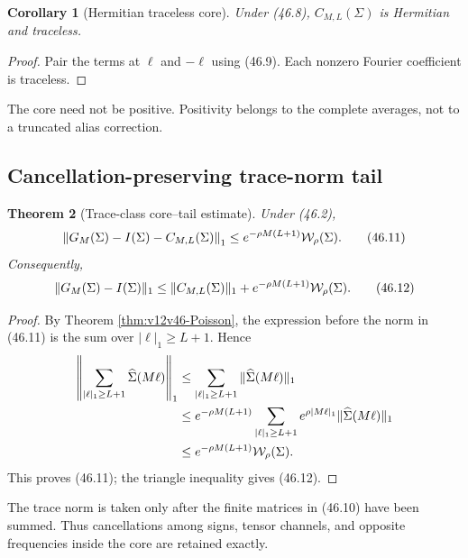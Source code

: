 \documentclass[11pt]{article}
\newtheorem{theorem}{Theorem}[section]
\newtheorem{corollary}[theorem]{Corollary}
\theoremstyle{remark}
\begin{document}
\begin{corollary}[Hermitian traceless core]
\label{cor:v12v46-core}
Under (46.8), \(C_{M,L}(\Sigma)\) is Hermitian and traceless.
\end{corollary}

\begin{proof}
Pair the terms at \(\ell\) and \(-\ell\) using (46.9).  Each
nonzero Fourier coefficient is traceless.
\end{proof}

The core need not be positive.  Positivity belongs to the complete
averages, not to a truncated alias correction.

\subsection{Cancellation-preserving trace-norm tail}

\begin{theorem}[Trace-class core--tail estimate]
\label{thm:v12v46-core-tail}
Under (46.2),
\begin{equation}
 \left\|
 G_M(\Sigma)-I(\Sigma)-C_{M,L}(\Sigma)
 \right\|_1
 \leq
 e^{-\rho M(L+1)}{\cal W}_\rho(\Sigma).           \tag{46.11}
\end{equation}
Consequently,
\begin{equation}
 \|G_M(\Sigma)-I(\Sigma)\|_1
 \leq
 \|C_{M,L}(\Sigma)\|_1
 +
 e^{-\rho M(L+1)}{\cal W}_\rho(\Sigma).           \tag{46.12}
\end{equation}
\end{theorem}

\begin{proof}
By Theorem \ref{thm:v12v46-Poisson}, the expression before the norm
in (46.11) is the sum over \(|\ell|_1\geq L+1\).  Hence
\begin{align*}
 \left\|
 \sum_{|\ell|_1\geq L+1}\widehat\Sigma(M\ell)
 \right\|_1
 &\leq
 \sum_{|\ell|_1\geq L+1}
 \|\widehat\Sigma(M\ell)\|_1\\
 &\leq
 e^{-\rho M(L+1)}
 \sum_{|\ell|_1\geq L+1}
 e^{\rho|M\ell|_1}\|\widehat\Sigma(M\ell)\|_1\\
 &\leq
 e^{-\rho M(L+1)}{\cal W}_\rho(\Sigma).
\end{align*}
This proves (46.11); the triangle inequality gives (46.12).
\end{proof}

The trace norm is taken only after the finite matrices in (46.10)
have been summed.  Thus cancellations among signs, tensor channels,
and opposite frequencies inside the core are retained exactly.
\end{document}
